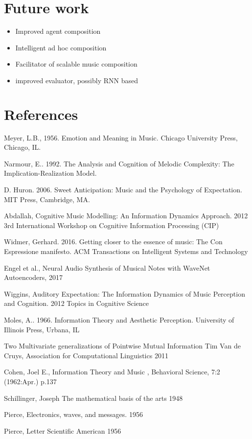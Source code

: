 \documentclass[final,authoryear,11pt,times]{elsarticle}
\begin{document}
\section {Future work}
\begin{itemize}
\item Improved agent composition
\item Intelligent ad hoc composition
\item Facilitator of scalable music composition
\item improved evaluator, possibly RNN based
\end{itemize}

\section{References}
Meyer, L.B., 1956. Emotion and Meaning in Music. Chicago University Press, Chicago, IL.

Narmour, E.. 1992. The Analysis and Cognition of Melodic Complexity: The Implication-Realization Model.

D. Huron. 2006. Sweet Anticipation: Music and the Psychology of Expectation. MIT Press, Cambridge, MA.

Abdallah, Cognitive Music Modelling: An Information Dynamics Approach. 2012 3rd International Workshop on Cognitive Information Processing (CIP)

Widmer, Gerhard. 2016. Getting closer to the essence of music: The Con Espressione manifesto. ACM Transactions on Intelligent Systems and Technology

Engel et al., Neural Audio Synthesis of Musical Notes with WaveNet Autoencoders, 2017

Wiggins, Auditory Expectation: The Information Dynamics of Music Perception and Cognition. 2012 Topics in Cognitive Science

Moles, A.. 1966. Information Theory and Aesthetic Perception. University of Illinois Press, Urbana, IL

Two Multivariate generalizations of Pointwise Mutual Information Tim Van de Cruys, Association for Computational Linguistics 2011

Cohen, Joel E., Information Theory and Music , Behavioral Science, 7:2 (1962:Apr.) p.137

Schillinger, Joseph The mathematical basis of the arts 1948

Pierce, Electronics, waves, and messages. 1956

Pierce, Letter Scientific American 1956
\end{document}
